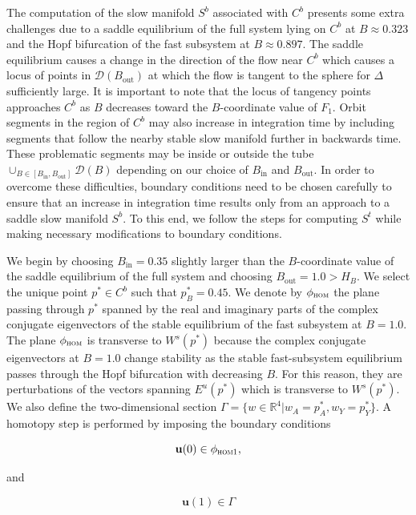 \documentclass{ws-ijbc}
\begin{document}
The computation of the slow manifold $S^b$ associated with $C^b$ presents some extra challenges due to a saddle equilibrium of the full system lying on $C^b$ at $B \approx 0.323$ and the Hopf bifurcation of the fast subsystem at $B \approx 0.897$.  The saddle equilibrium causes a change in the direction of the flow near $C^b$ which causes a locus of points in $\mathscr{D}(B_{\mathrm{out}})$ at which the flow is tangent to the sphere for $\Delta$ sufficiently large.  It is important to note that the locus of tangency points approaches $C^b$ as $B$ decreases toward the $B$-coordinate value of $F_1$.  Orbit segments in the region of $C^b$ may also increase in integration time by including segments that follow the nearby stable slow manifold further in backwards time.  These problematic segments may be inside or outside the tube $\cup_{B \in [B_{\mathrm{in}},B_{\mathrm{out}}]}\mathscr{D}(B)$ depending on our choice of $B_{\mathrm{in}}$ and $B_{\mathrm{out}}$.  In order to overcome these difficulties, boundary conditions need to be chosen carefully to ensure that an increase in integration time results only from an approach to a saddle slow manifold $S^b$.  To this end, we follow the steps for computing $S^t$ while making necessary modifications to boundary conditions.

We begin by choosing $B_{\mathrm{in}} = 0.35$ slightly larger than the $B$-coordinate value of the saddle equilibrium of the full system and choosing $B_{\mathrm{out}}=1.0 > H_B$.  We select the unique point $p^* \in C^b$ such that $p^*_B = 0.45$.  We denote by $\phi_{\textsc{hom}}$ the plane passing through $p^*$ spanned by the real and imaginary parts of the complex conjugate eigenvectors of the stable equilibrium of the fast subsystem at $B=1.0$.  The plane $\phi_{\textsc{hom}}$ is transverse to $W^s(p^*)$ because the complex conjugate eigenvectors at $B=1.0$ change stability as the stable fast-subsystem equilibrium passes through the Hopf bifurcation with decreasing $B$.  For this reason, they are perturbations of the vectors spanning $E^u(p^*)$ which is transverse to $W^s(p^*)$.  We also define the two-dimensional section $\Gamma = \{ w \in \mathbb{R}^4 | w_A=p^*_A, w_Y=p^*_Y \}$.  A homotopy step is performed by imposing the boundary conditions

\begin{equation}
\mathbf{u}(0) \in \phi_{\textsc{hom1}},
\label{BC_unstable1}
\end{equation}

and

\begin{equation}
\mathbf{u}(1) \in \Gamma
\label{BC_unstable2}
\end{equation}
\end{document}
